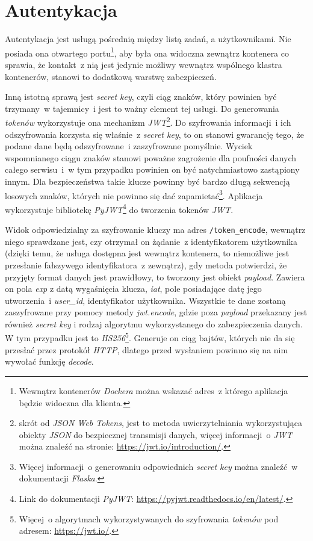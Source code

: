 \section{Autentykacja}
\label{sec:autentykacja}
Autentykacja jest usługą pośrednią między listą zadań, a użytkownikami. Nie posiada ona otwartego portu\footnote{Wewnątrz kontenerów \textit{Dockera} można wskazać adres~z którego aplikacja będzie widoczna dla klienta\cite{docker}.}, aby była ona widoczna zewnątrz kontenera co sprawia, że kontakt~z nią jest jedynie możliwy wewnątrz wspólnego klastra kontenerów, stanowi to dodatkową warstwę zabezpieczeń. 

Inną istotną sprawą jest \textit{secret key}\cite{flask}, czyli ciąg znaków, który powinien być trzymany~w tajemnicy~i jest to ważny element tej usługi. Do generowania \textit{tokenów} wykorzystuje ona mechanizm \textit{JWT}\footnote{skrót od \textit{JSON Web Tokens}, jest to metoda uwierzytelniania wykorzystująca obiekty \textit{JSON} do bezpiecznej transmisji danych, więcej informacji~o \textit{JWT} można znaleźć na stronie: \url{https://jwt.io/introduction/}.}. Do szyfrowania informacji~i ich odszyfrowania korzysta się właśnie~z \textit{secret key}, to on stanowi gwarancję tego, że podane dane będą odszyfrowane~i zaszyfrowane pomyślnie. Wyciek wspomnianego ciągu znaków stanowi poważne zagrożenie dla poufności danych całego serwisu~i~w tym przypadku powinien on być natychmiastowo zastąpiony innym. Dla bezpieczeństwa takie klucze powinny być bardzo długą sekwencją losowych znaków\cite{flask}, których nie powinno się dać zapamietać\footnote{Więcej informacji~o generowaniu odpowiednich \textit{secret key} można znaleźć~w dokumentacji \textit{Flaska}\cite{flask}.}. Aplikacja wykorzystuje bibliotekę \textit{PyJWT}\footnote{Link do dokumentacji \textit{PyJWT}: \url{https://pyjwt.readthedocs.io/en/latest/}.} do tworzenia tokenów \textit{JWT}.


Widok odpowiedzialny za szyfrowanie kluczy ma adres \verb|/token_encode|, wewnątrz niego sprawdzane jest, czy otrzymał on żądanie~z identyfikatorem użytkownika (dzięki temu, że usługa dostępna jest wewnątrz kontenera, to niemożliwe jest przesłanie fałszywego identyfikatora~z zewnątrz), gdy metoda potwierdzi, że przyjęty format danych jest prawidłowy, to tworzony jest obiekt \textit{payload}. Zawiera on pola \textit{exp} z datą wygaśnięcia klucza, \textit{iat}, pole posiadające datę jego utworzenia~i \textit{user\_id}, identyfikator użytkownika\cite{Herman:2017}. Wszystkie te dane zostaną zaszyfrowane przy pomocy metody \textit{jwt.encode}, gdzie poza \textit{payload} przekazany jest również \textit{secret key} i rodzaj algorytmu wykorzystanego do zabezpieczenia danych. W tym przypadku jest to \textit{HS256}\footnote{Więcej~o algorytmach wykorzystywanych do szyfrowania \textit{tokenów} pod adresem: \url{https://jwt.io/}.}. Generuje on ciąg bajtów, których nie da się przesłać przez protokół \textit{HTTP}, dlatego przed wysłaniem powinno się na nim wywołać funkcję \textit{decode}.

